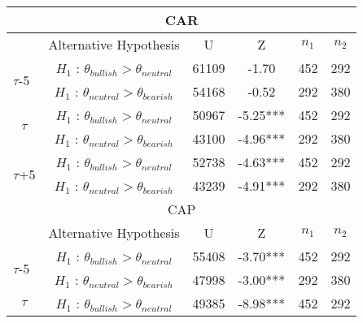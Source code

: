 \begin{table} 
\centering
\begin{tabular}{|c|c|c|c|c|c|}
\hline
\multicolumn{6}{|c|}{CAR}                                                                                                                                    \\ \hline 
\multicolumn{1}{|l|}{}                     & Alternative Hypothesis                                                         & U     & Z        & $n_1$ & $n_2$ \\ \hline
\multicolumn{1}{|l|}{\multirow{2}{*}{$\tau$-5}} & $H_1$ : $\theta_{bullish} > \theta_{neutral}$ & 61109 & -1.70    & 452  & 292  \\
\multicolumn{1}{|l|}{}                     & $H_1$ : $\theta_{neutral} > \theta_{bearish}$  & 54168 & -0.52    & 292  & 380  \\ \hline
\multirow{2}{*}{$\tau$}                         & $H_1$ : $\theta_{bullish} > \theta_{neutral}$ & 50967 & -5.25*** & 452  & 292  \\
                                           & $H_1$ : $\theta_{neutral} > \theta_{bearish}$  & 43100 & -4.96*** & 292  & 380  \\ \hline
\multirow{2}{*}{$\tau$+5}                       & $H_1$ : $\theta_{bullish} > \theta_{neutral}$ & 52738 & -4.63*** & 452  & 292  \\
                                           & $H_1$ : $\theta_{neutral} > \theta_{bearish}$  & 43239 & -4.91*** & 292  & 380  \\ \hline \hline
\multicolumn{6}{|c|}{CAP}                                                                                                                                    \\ \hline
\multicolumn{1}{|l|}{}                     & Alternative Hypothesis                                                         & U     & Z        & $n_1$ & $n_2$ \\ \hline
\multicolumn{1}{|l|}{\multirow{2}{*}{$\tau$-5}} & $H_1$ : $\theta_{bullish} > \theta_{neutral}$ & 55408 & -3.70*** & 452  & 292  \\
\multicolumn{1}{|l|}{}                     & $H_1$ : $\theta_{neutral} > \theta_{bearish}$  & 47998 & -3.00***   & 292  & 380  \\ \hline
\multirow{2}{*}{$\tau$}                         & $H_1$ : $\theta_{bullish} > \theta_{neutral}$ & 49385 & -8.98*** & 452  & 292  \\

\end{tabular}
\end{table}
